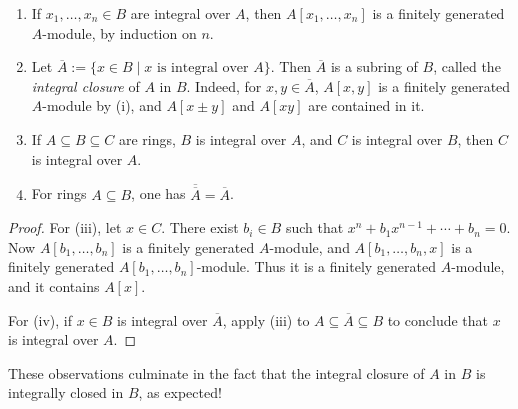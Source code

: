 \documentclass[11pt,a4paper]{article}
\begin{document}
\setcounter{theorem}{21}\begin{corollary}
\begin{enumerate}[label=(\roman*)]
\setcounter{enumi}{0}\item If $x_1,\ldots,x_n\in B$ are integral over $A$, then $A[x_1,\ldots,x_n]$ is a finitely generated $A$-module, by induction on $n$.
\setcounter{enumi}{1}\item Let $\overline A:=\{x\in B\mid x\text{ is integral over }A\}$. Then $\overline A$ is a subring of $B$, called the \emph{integral closure} of $A$ in $B$. Indeed, for $x,y\in\overline A$, $A[x,y]$ is a finitely generated $A$-module by (i), and $A[x\pm y]$ and $A[xy]$ are contained in it.
\setcounter{enumi}{2}\item If $A\subseteq B\subseteq C$ are rings, $B$ is integral over $A$, and $C$ is integral over $B$, then $C$ is integral over $A$.
\setcounter{enumi}{3}\item For rings $A\subseteq B$, one has $\overline{\overline A}=\overline A$.
\end{enumerate}
\end{corollary}
\begin{proof}
For (iii), let $x\in C$. There exist $b_i\in B$ such that $x^n+b_1x^{n-1}+\cdots+b_n=0$. Now $A[b_1,\ldots,b_n]$ is a finitely generated $A$-module, and $A[b_1,\ldots,b_n,x]$ is a finitely generated $A[b_1,\ldots,b_n]$-module. Thus it is a finitely generated $A$-module, and it contains $A[x]$.

For (iv), if $x\in B$ is integral over $\overline A$, apply (iii) to $A\subseteq\overline A\subseteq B$ to conclude that $x$ is integral over $A$.
\end{proof}
These observations culminate in the fact that the integral closure of $A$ in $B$ is integrally closed in $B$, as expected!
\end{document}

